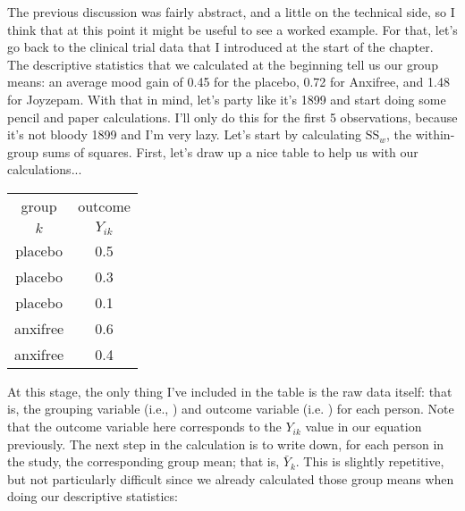 

The previous discussion was fairly abstract, and a little on the technical side, so I think that at this point it might be useful to see a worked example. For that, let's go back to the clinical trial data that I introduced at the start of the chapter. The descriptive statistics that we calculated at the beginning tell us our group means: an average mood gain of 0.45 for the placebo, 0.72 for Anxifree, and 1.48 for Joyzepam. With that in mind, let's party like it's 1899  and  start doing some pencil and paper calculations. I'll only do this for the first 5 observations, because it's not bloody 1899 and I'm very lazy. Let's start by calculating $\mbox{SS}_{w}$, the within-group sums of squares. First, let's draw up a nice table to help us with our calculations... 

\small
\vspace*{6pt}
\begin{tabular}{c|c} %
{group} & {outcome}  \\ %
  $k$ &  $Y_{ik}$ \\ \hline %
{placebo}  & {0.5}  \\%
{placebo}  & {0.3} \\%
{placebo}  &  {0.1}\\%
{anxifree}  & {0.6} \\%
{anxifree}  & {0.4}\\%
\end{tabular}
\vspace*{6pt}
\normalsize

\noindent
At this stage, the only thing I've included in the table is the raw data itself: that is, the grouping variable (i.e., ) and outcome variable (i.e. ) for each person. Note that the outcome variable here corresponds to the $Y_{ik}$ value in our equation previously. The next step in the calculation is to write down, for each person in the study, the corresponding group mean; that is, $\bar{Y}_k$. This is slightly repetitive, but not particularly difficult since we already calculated those group means when doing our descriptive statistics:

